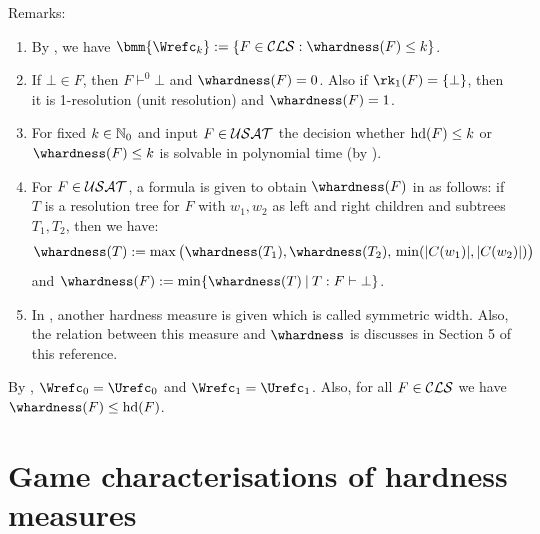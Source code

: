 \documentclass{report}
\begin{document}
Remarks:
  \begin{enumerate}
  \item By \cite{BeyersdorffKullmann2014PHP}, we have $\bmm{\Wrefc_k}:= \set{F \in \Cls : \whardness(F) \le k}$. 
  \item If $\bot \in F$, then $F \vdash^0 \bot$ and $\whardness(F)=0$. Also if $\rk_1(F)=\set{\bot}$, then it is 1-resolution (unit resolution) and  $\whardness(F)=1$.
  \item For fixed $k \in \mathbb{N}_0$ and input $F \in \mathcal{USAT}$ the decision whether $\operatorname{hd}(F) \le k$ or $\whardness(F) \le k$ is solvable in polynomial time (by \cite{BeyersdorffKullmann2014PHP}). 
  \item For $F \in \mathcal{USAT}$, a formula is given to obtain $\whardness(F)$ in \cite{BeyersdorffGwynneKullmann2013PHPER} as follows: if $T$ is a resolution tree for $F$ with $w_1, w_2$ as left and right children and subtrees $T_1, T_2$, then we have:
  \begin{displaymath}
  \whardness(T) := \max \big (\whardness(T_1), \whardness(T_2), \, \min(\abs{C(w_1)}, \abs{C(w_2)}) \big )
  \end{displaymath}
  and $\whardness(F) := \min \set{\whardness(T) \mb T : F \vdash \bot}$.
  \item In \cite{BeyersdorffGwynneKullmann2013PHPER}, another hardness measure is given which is called symmetric width. Also, the relation between this measure and $\whardness$ is discusses in Section 5 of this reference.
  \end{enumerate}
  
\begin{lem}\label{lem:hd-whd}
By \cite{BeyersdorffKullmann2014PHP}, $\Wrefc_0 = \Urefc_0$ and $\Wrefc_1 = \Urefc_1$. Also, for all $F \in \mathcal{CLS}$ we have $\whardness(F) \le \hardness(F)$.
\end{lem}
\section{Game characterisations of hardness measures}
\label{sec:game-pd}
\end{document}
